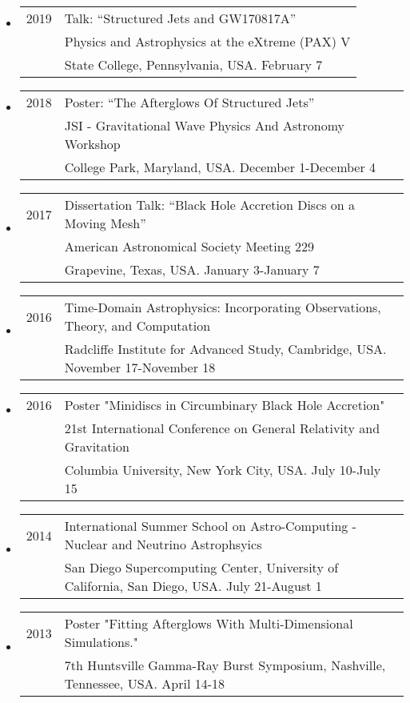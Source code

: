 \begin{itemize}
\item \begin{tabular}{ll}
2019 & Talk: ``Structured Jets and GW170817A'' \\
	 & Physics and Astrophysics at the eXtreme (PAX) V \\
	 & State College, Pennsylvania, USA. February 7
\end{tabular}

\item \begin{tabular}{ll}
2018 & Poster: ``The Afterglows Of Structured Jets'' \\
	 & JSI - Gravitational Wave Physics And Astronomy Workshop \\
	 & College Park, Maryland, USA. December 1-December 4
\end{tabular}

\item \begin{tabular}{ll}
2017 & Dissertation Talk: ``Black Hole Accretion Discs on a Moving Mesh'' \\
	 & American Astronomical Society Meeting 229 \\
	 & Grapevine, Texas, USA. January 3-January 7
\end{tabular}
\item \begin{tabular}{ll}
2016 & Time-Domain Astrophysics: Incorporating Observations, Theory, and Computation \\
	 & Radcliffe Institute for Advanced Study, Cambridge, USA. November 17-November 18
\end{tabular}
\item \begin{tabular}{ll}
2016 & Poster "Minidiscs in Circumbinary Black Hole Accretion" \\
	& 21st International Conference on General Relativity and Gravitation \\ 
	& Columbia University, New York City, USA. July 10-July 15
\end{tabular}

\item \begin{tabular}{ll}
2014 & International Summer School on Astro-Computing - Nuclear and Neutrino Astrophsyics \\ 
	& San Diego Supercomputing Center, University of California, San Diego, USA. July 21-August 1
\end{tabular}

\item \begin{tabular}{ll}
2013 & Poster "Fitting Afterglows With Multi-Dimensional Simulations." \\ 
	&7th Huntsville Gamma-Ray Burst Symposium, Nashville, Tennessee, USA.  April 14-18 \\
\end{tabular}


\end{itemize}
